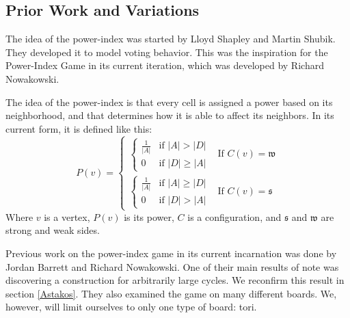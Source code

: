 \documentclass[12pt]{article}
\theoremstyle{definition}
\theoremstyle{remark}
\theoremstyle{remark}
\begin{document}
\subsection{Prior Work and Variations} \label{PriorWork}
\par
The idea of the power-index was started by Lloyd Shapley and Martin Shubik. \cite{ref:PowerIndex} They developed it to model voting behavior. This was the inspiration for the Power-Index Game in its current iteration, which was developed by Richard Nowakowski.
\par
The idea of the power-index is that every cell is assigned a power based on its neighborhood, and that determines how it is able to affect its neighbors. In its current form, it is defined like this:
\begin{equation}
	P(v) =
	\begin{cases}
		\begin{cases}
			\frac{1}{|A|} & \text{if\ } |A|>|D| \\
			0 & \text{if\ } |D|\geq|A|
		\end{cases} & \text{If\ }C(v)=\mathfrak{w} \\
		\begin{cases}
			\frac{1}{|A|} & \text{if\ } |A|\geq |D| \\
			0 & \text{if\ } |D|> |A|
		\end{cases} & \text{If\ }C(v)=\mathfrak{s}
	\end{cases}
\end{equation}
Where $v$ is a vertex, $P(v)$ is its power, $C$ is a configuration, and $\mathfrak{s}$ and $\mathfrak{w}$ are strong and weak sides.
\par
Previous work on the power-index game in its current incarnation was done by Jordan Barrett and Richard Nowakowski. One of their main results of note was discovering a construction for arbitrarily large cycles. We reconfirm this result in section \ref{Astakos}. They also examined the game on many different boards. We, however, will limit ourselves to only one type of board: tori.



\end{document}
